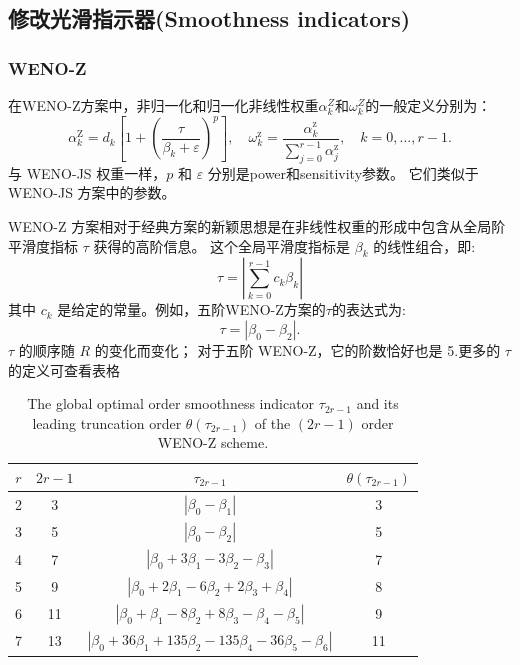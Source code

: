\documentclass{book}
\begin{document}
\subsection{修改光滑指示器(Smoothness indicators)}
\subsubsection{WENO-Z}
在WENO-Z方案中，非归一化和归一化非线性权重$\alpha_{k}^{Z}$和$\omega_{k}^{Z}$的一般定义分别为：
\begin{equation}
  \alpha_{k}^{\mathrm{Z}}=d_{k}\left[1+\left(\frac{\tau}{\beta_{k}+\varepsilon}\right)^{p}\right], \quad \omega_{k}^{\mathrm{z}}=\frac{\alpha_{k}^{\mathrm{z}}}{\sum_{j=0}^{r-1} \alpha_{j}^{\mathrm{z}}}, \quad k=0, \ldots, r-1 .
\end{equation}
与 WENO-JS 权重一样，$p$ 和 $\varepsilon$ 分别是power和sensitivity参数。 它们类似于 WENO-JS 方案中的参数。

WENO-Z 方案相对于经典方案的新颖思想是在非线性权重的形成中包含从全局阶平滑度指标 $\tau$ 获得的高阶信息。 这个全局平滑度指标是 $\beta_{k}$ 的线性组合，即:
\begin{equation}
  \tau=\left|\sum_{k=0}^{r-1} c_{k} \beta_{k}\right|
\end{equation}
其中 $c_{k}$ 是给定的常量。例如，五阶WENO-Z方案的$\tau$的表达式为:
\begin{equation}
  \tau=\left|\beta_{0}-\beta_{2}\right| .
\end{equation}
$\tau$ 的顺序随 $R$ 的变化而变化； 对于五阶 WENO-Z，它的阶数恰好也是 5.更多的 $\tau$ 的定义可查看表格\cite{WENO-Z-2013}
\begin{table}[htbp]
  \centering
  \label{table:tau_ref}
  \caption{The global optimal order smoothness indicator  $\tau_{2 r-1}$  and its leading truncation order  $\theta\left(\tau_{2 r-1}\right)$  of the  $(2 r-1)$  order WENO-Z scheme.}
  \begin{tabular}{cccc}
    \toprule
    $r$ & $2r-1$ & $\tau_{2r-1}$                                                 & $\theta(\tau_{2r-1})$ \\
    \midrule
    2   & 3      & $|\beta_0-\beta_1|$                                           & 3                     \\
    3   & 5      & $|\beta_0-\beta_2|$                                           & 5                     \\
    4   & 7      & $|\beta_0+3\beta_1-3\beta_2-\beta_3|$                         & 7                     \\
    5   & 9      & $|\beta_0+2\beta_1-6\beta_2+2\beta_3+\beta_4|$                & 8                     \\
    6   & 11     & $|\beta_0+\beta_1-8\beta_2+8\beta_3-\beta_4-\beta_5|$         & 9                     \\
    7   & 13     & $|\beta_0+36\beta_1+135\beta_2-135\beta_4-36\beta_5-\beta_6|$ & 11                    \\
    \bottomrule
  \end{tabular}
\end{table}
\end{document}
